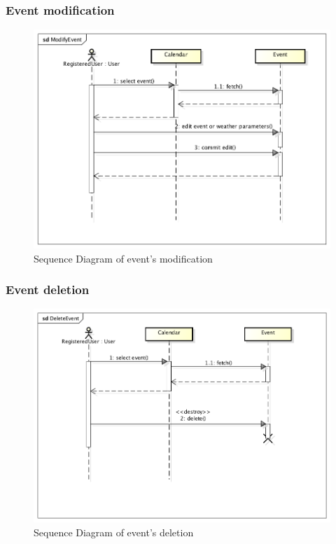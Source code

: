 \subsubsection{Event modification}
\begin{center}
 \begin{figure}[H]
    \includegraphics[width=1\textwidth]{../UMLDiagram/sequence/ModifyEvent/ModifyEvent.png}
    \caption{Sequence Diagram of event's modification}
     \label{fig:modseqdiag}
     \end{figure}
   \end{center}  
\subsubsection{Event deletion}
\begin{center}
 \begin{figure}[H]
    \includegraphics[width=1\textwidth]{../UMLDiagram/sequence/DeleteEvent/DeleteEvent.png}
    \caption{Sequence Diagram of event's deletion}
     \label{fig:delseqdiag}
     \end{figure}
   \end{center}  
